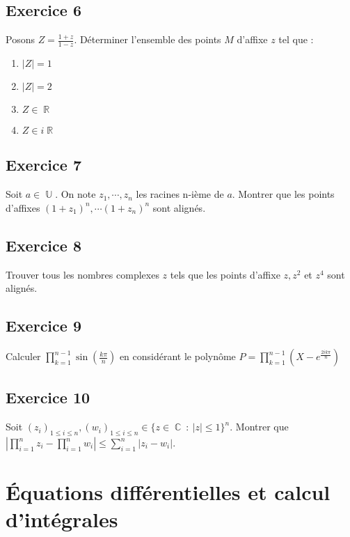 \documentclass{article}
\DeclareMathOperator{\R}{\mathbb{R}}
\DeclareMathOperator{\C}{\mathbb{C}}
\DeclareMathOperator{\U}{\mathbb{U}}
\begin{document}
\subsection*{Exercice 6} 

Posons $Z = \displaystyle\frac{1+z}{1-z}$. Déterminer l'ensemble des points $M$ d'affixe $z$ tel que :
\begin{enumerate}
    \item $|Z| = 1$ 
    \item $|Z| = 2$ 
    \item $Z \in \R$ 
    \item $Z \in i\R$ 
\end{enumerate}


\subsection*{Exercice 7} 

Soit $a \in \U$. On note $z_1, \cdots, z_n$ les racines n-ième de $a$. Montrer que les points d'affixes $(1+z_1)^n, \cdots (1+z_n)^n$ sont alignés. 

\subsection*{Exercice 8} 

Trouver tous les nombres complexes $z$ tels que les points d'affixe $z, z^2$ et $z^4$ sont alignés. 

\subsection*{Exercice 9} 

Calculer $\displaystyle\prod_{k=1}^{n-1}{\sin \left(\frac{k\pi}{n}\right)}$ en considérant le polynôme $P = \displaystyle\prod_{k=1}^{n-1}{(X-e^{\frac{2i k\pi}{n}})}$ 

\subsection*{Exercice 10} 

Soit $(z_i)_{1\leq i \leq n}, (w_i)_{1\leq i \leq n} \in \{z \in \C \ : \ |z| \leq 1\}^n$. Montrer que $\displaystyle \left|\prod_{i=1}^n{z_i} - \prod_{i=1}^n{w_i}\right| \leq \sum_{i=1}^n{|z_i - w_i|}$. 

\clearpage

\section{Équations différentielles et calcul d'intégrales}
\end{document}
